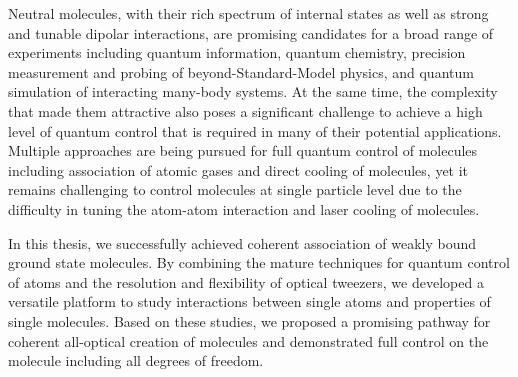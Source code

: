 
Neutral molecules, with their rich spectrum of internal states as well as
strong and tunable dipolar interactions, are promising candidates for
a broad range of experiments including quantum information,
quantum chemistry, precision measurement and probing of beyond-Standard-Model physics,
and quantum simulation of interacting many-body systems.
At the same time, the complexity that made them attractive also poses a significant challenge
to achieve a high level of quantum control that is required in many of
their potential applications.
Multiple approaches are being pursued for full quantum control of molecules
including association of atomic gases and direct cooling of molecules,
yet it remains challenging to control molecules at single particle level
due to the difficulty in tuning the atom-atom interaction
and laser cooling of molecules.

In this thesis, we successfully achieved coherent association of
weakly bound ground state molecules.
By combining the mature techniques for quantum control of atoms
and the resolution and flexibility of optical tweezers,
we developed a versatile platform to study interactions between single atoms
and properties of single molecules.
Based on these studies, we proposed a promising pathway
for coherent all-optical creation of molecules
and demonstrated full control on the molecule including all degrees of freedom.
